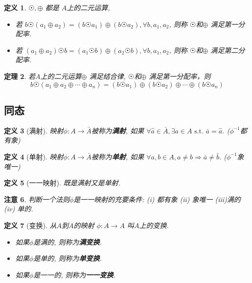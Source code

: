 \documentclass[UTF8]{ctexart}
\newtheorem{Definition}{定义}%
\newtheorem{Theorem}[Definition]{定理}
\newtheorem{Remark}[Definition]{注意}
\begin{document}
\begin{Definition}
$ \astrosun, \oplus $ 都是 $A$上的二元运算, 
\begin{itemize}
\item 若
$ b \astrosun (a_1 \oplus a_2) = (b \astrosun a_1) \oplus (b \astrosun a_2), \forall b, a_1, a_2 $, 则称 $ \astrosun$和$ \oplus $  满足第一分配率.
\item 若
$ (a_1 \oplus a_2) \astrosun b = (a_1 \astrosun b) \oplus ( a_2 \astrosun b), \forall b, a_1, a_2 $, 则称 $ \astrosun$和$\oplus $  满足第二分配率.
\end{itemize}
\end{Definition}


\begin{Theorem}
若$A$上的二元运算$\oplus$ 满足结合律, $ \astrosun $和$\oplus $ 满足第一分配率，则
$$
b \astrosun ( a_1 \oplus a_2 \oplus \cdots \oplus a_n ) =  ( b \astrosun a_1) \oplus (b \astrosun a_2) \oplus \cdots \oplus (b \astrosun a_n)
$$
\end{Theorem}

\subsection{同态}

\begin{Definition}[满射]
映射$\phi: A \rightarrow \bar{A}$被称为\textbf{满射}, 如果
$\forall \hat{a} \in \bar{A}, \exists a \in A \text{ s.t. } \bar{a} = \hat{a}$. 
($\phi^{-1}$都有象)
\end{Definition}

\begin{Definition}[单射]
映射$\phi: A \rightarrow \bar{A}$被称为\textbf{单射}, 如果
$\forall a, b \in A, a \neq b \Rightarrow \bar{a} \neq \bar{b}$.
 ($\phi^{-1}$象唯一)
\end{Definition}

\begin{Definition}[一一映射]
既是满射又是单射.
\end{Definition}

\begin{Remark}
 		判断一个法则$\phi$是一一映射的充要条件: (i) 都有象 (ii) 象唯一 (iii)满的 (iv) 单的.
\end{Remark}

\begin{Definition}[变换]
从$A$到$A$的映射 $\phi: A \rightarrow A$ 叫$A$上的变换.
\begin{itemize}
	\item 如果$\phi$是满的, 则称为\textbf{满变换}.
	\item 如果$\phi$是单的, 则称为\textbf{单变换}.
	\item 如果$\phi$是一一的, 则称为\textbf{一一变换}.
\end{itemize}
\end{Definition}
\end{document}
